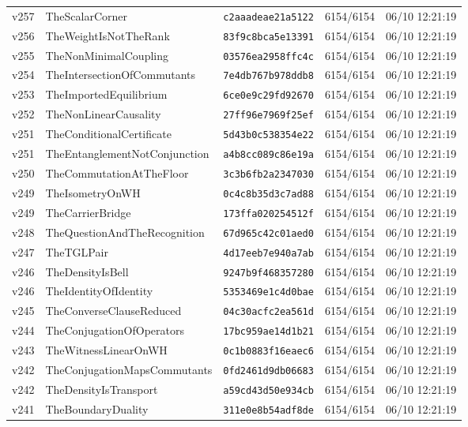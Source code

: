 \documentclass[11pt]{article}
\theoremstyle{definition}\newtheorem{deriv}{Derivation}
\begin{document}
{\begin{longtable}{@{}lllll@{}}
v257 & TheScalarCorner & \texttt{c2aaadeae21a5122} & 6154/6154 & 06/10 12:21:19 \\
v256 & TheWeightIsNotTheRank & \texttt{83f9c8bca5e13391} & 6154/6154 & 06/10 12:21:19 \\
v255 & TheNonMinimalCoupling & \texttt{03576ea2958ffc4c} & 6154/6154 & 06/10 12:21:19 \\
v254 & TheIntersectionOfCommutants & \texttt{7e4db767b978ddb8} & 6154/6154 & 06/10 12:21:19 \\
v253 & TheImportedEquilibrium & \texttt{6ce0e9c29fd92670} & 6154/6154 & 06/10 12:21:19 \\
v252 & TheNonLinearCausality & \texttt{27ff96e7969f25ef} & 6154/6154 & 06/10 12:21:19 \\
v251 & TheConditionalCertificate & \texttt{5d43b0c538354e22} & 6154/6154 & 06/10 12:21:19 \\
v251 & TheEntanglementNotConjunction & \texttt{a4b8cc089c86e19a} & 6154/6154 & 06/10 12:21:19 \\
v250 & TheCommutationAtTheFloor & \texttt{3c3b6fb2a2347030} & 6154/6154 & 06/10 12:21:19 \\
v249 & TheIsometryOnWH & \texttt{0c4c8b35d3c7ad88} & 6154/6154 & 06/10 12:21:19 \\
v249 & TheCarrierBridge & \texttt{173ffa020254512f} & 6154/6154 & 06/10 12:21:19 \\
v248 & TheQuestionAndTheRecognition & \texttt{67d965c42c01aed0} & 6154/6154 & 06/10 12:21:19 \\
v247 & TheTGLPair & \texttt{4d17eeb7e940a7ab} & 6154/6154 & 06/10 12:21:19 \\
v246 & TheDensityIsBell & \texttt{9247b9f468357280} & 6154/6154 & 06/10 12:21:19 \\
v246 & TheIdentityOfIdentity & \texttt{5353469e1c4d0bae} & 6154/6154 & 06/10 12:21:19 \\
v245 & TheConverseClauseReduced & \texttt{04c30acfc2ea561d} & 6154/6154 & 06/10 12:21:19 \\
v244 & TheConjugationOfOperators & \texttt{17bc959ae14d1b21} & 6154/6154 & 06/10 12:21:19 \\
v243 & TheWitnessLinearOnWH & \texttt{0c1b0883f16eaec6} & 6154/6154 & 06/10 12:21:19 \\
v242 & TheConjugationMapsCommutants & \texttt{0fd2461d9db06683} & 6154/6154 & 06/10 12:21:19 \\
v242 & TheDensityIsTransport & \texttt{a59cd43d50e934cb} & 6154/6154 & 06/10 12:21:19 \\
v241 & TheBoundaryDuality & \texttt{311e0e8b54adf8de} & 6154/6154 & 06/10 12:21:19 \\

\end{longtable}}
\end{document}
